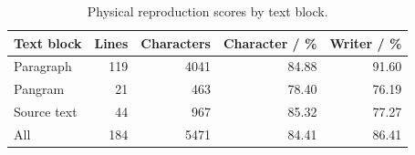 \begin{table}[!htbp]\centering\small
\begin{tabular}{lrrrr}\toprule
\textbf{Text block} & \textbf{Lines} & \textbf{Characters} & \textbf{Character / \%} & \textbf{Writer / \%}\\\midrule
Paragraph & 119 & 4041 & 84.88 & 91.60\\
Pangram & 21 & 463 & 78.40 & 76.19\\
Source text & 44 & 967 & 85.32 & 77.27\\
All & 184 & 5471 & 84.41 & 86.41\\
\bottomrule\end{tabular}
\caption{Physical reproduction scores by text block.}\label{tab:res-r1-blocks}
\end{table}

